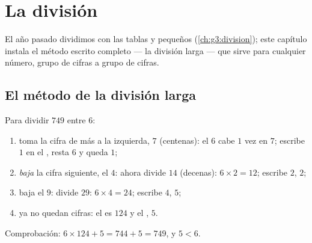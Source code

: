 \chapter{La división}\label{ch:g4:division}

El año pasado dividimos con las tablas y  pequeños
(\cref{ch:g3:division}); este capítulo instala el método escrito
completo --- la división larga --- que sirve para cualquier número, grupo de cifras
a grupo de cifras.

\section{El método de la división larga}

\begin{method}\label{met:g4:division:method}
Para dividir $749$ entre $6$:
\begin{enumerate}
  \item toma la cifra de más a la izquierda, $7$ (centenas): el $6$ cabe $1$ vez
        en $7$; escribe $1$ en el , resta
        $6$ y queda  $1$;
  \item \emph{baja} la cifra siguiente, el $4$: ahora divide $14$
        (decenas): $6 \times 2 = 12$; escribe $2$,  $2$;
  \item baja el $9$: divide $29$: $6 \times 4 = 24$; escribe
        $4$,  $5$;
  \item ya no quedan cifras: el  es $124$ y el , $5$.
\end{enumerate}
Comprobación: $6 \times 124 + 5 = 744 + 5 = 749$, y $5 < 6$.
\end{method}


